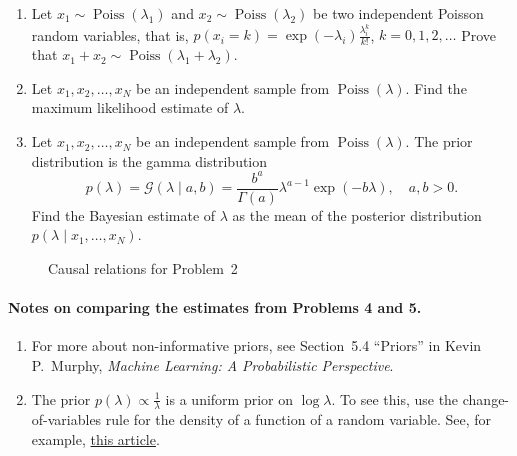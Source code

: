 \documentclass[11pt]{article}
\DeclareMathOperator{\Poiss}{Poiss}
\newcommand{\Gam}{\mathcal{G}}
\begin{document}
\begin{enumerate}[label=\arabic*.]
\begin{center}
    \medskip
    $p(P = 1) = 0.2, \qquad p(D = 1) = 0.4.$
  \end{center}
  Find $p(P = 1 \mid H = 1)$, $p(P = 1 \mid T = 1)$, and
  $p(P = 1 \mid T = 1, H = 1)$.

\item Let $x_1 \sim \Poiss(\lambda_1)$ and $x_2 \sim \Poiss(\lambda_2)$ be
  two independent Poisson random variables, that is,
  $p(x_i = k) = \exp(-\lambda_i) \frac{\lambda_i^k}{k!}$,
  $k = 0, 1, 2, \ldots$ Prove that
  $x_1 + x_2 \sim \Poiss(\lambda_1 + \lambda_2)$.

\item Let $x_1, x_2, \ldots, x_N$ be an independent sample from
  $\Poiss(\lambda)$. Find the maximum likelihood estimate of $\lambda$.

\item Let $x_1, x_2, \ldots, x_N$ be an independent sample from
  $\Poiss(\lambda)$. The prior distribution is the gamma distribution
  \[
    p(\lambda) = \Gam(\lambda \mid a, b)
    = \frac{b^a}{\Gamma(a)} \lambda^{a - 1} \exp(-b \lambda),
    \quad a, b > 0.
  \]
  Find the Bayesian estimate of $\lambda$ as the mean of the posterior
  distribution $p(\lambda \mid x_1, \ldots, x_N)$.

\end{enumerate}

\begin{figure}[ht]
  \centering
  \vspace{-1em}
  \caption{Causal relations for Problem~2}
  \label{fig:model}
\end{figure}

\paragraph{Notes on comparing the estimates from Problems 4 and 5.}

\begin{enumerate}[label=\arabic*.]
  \item For more about non-informative priors, see Section~5.4 ``Priors''
    in Kevin P.\ Murphy, \emph{Machine Learning: A Probabilistic
    Perspective}.
  \item The prior $p(\lambda) \propto \frac{1}{\lambda}$ is a uniform prior
    on $\log \lambda$. To see this, use the change-of-variables rule for
    the density of a function of a random variable. See, for example,
    \href{https://en.wikipedia.org/wiki/Probability_density_function#Function_of_random_variables_and_change_of_variables_in_the_probability_density_function}{this
    article}.
\end{enumerate}
\end{document}
